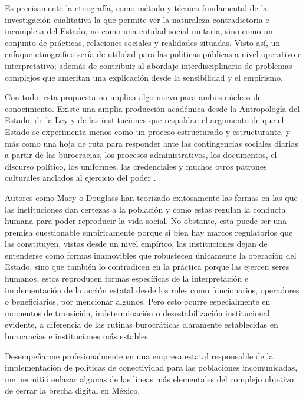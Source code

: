 \documentclass[
  spanish,
  11pt,
  a4paper,
]{scrbook}
\begin{document}
Es precisamente la etnografía, como método y técnica fundamental de la
investigación cualitativa la que permite ver la naturaleza
contradictoria e incompleta del Estado, no como una entidad social
unitaria, sino como un conjunto de prácticas, relaciones sociales y
realidades situadas. Visto así, un enfoque etnográfico sería de utilidad
para las políticas públicas a nivel operativo e interpretativo; además
de contribuir al abordaje interdisciplinario de problemas complejos que
ameritan una explicación desde la sensibilidad y el empirismo.

Con todo, esta propuesta no implica algo nuevo para ambos núcleos de
conocimiento. Existe una amplia producción académica desde la
Antropología del Estado, de la Ley y de las instituciones que respaldan
el argumento de que el Estado se experimenta menos como un proceso
estructurado y estructurante, y más como una hoja de ruta para responder
ante las contingencias sociales diarias a partir de las burocracias, los
procesos administrativos, los documentos, el discurso político, los
uniformes, las credenciales y muchos otros patrones culturales anclados
al ejercicio del poder
\autocite{Lipsky2010,Gupta2012,Weber1978,Das2004}.

Autores como Mary \textcite{Douglas1986} o Douglass \textcite{North1995}
han teorizado exitosamente las formas en las que las instituciones dan
certezas a la población y como estas regulan la conducta humana para
poder reproducir la vida social. No obstante, esta puede ser una premisa
cuestionable empíricamente porque si bien hay marcos regulatorios que
las constituyen, vistas desde un nivel empírico, las instituciones dejan
de entenderse como formas inamovibles que robustecen únicamente la
operación del Estado, sino que también lo contradicen en la práctica
porque las ejercen seres humanos, estos reproducen formas específicas de
la interpretación e implementación de la acción estatal desde los roles
como funcionarios, operadores o beneficiarios, por mencionar algunos.
Pero esto ocurre especialmente en momentos de transición,
indeterminación o desestabilización institucional evidente, a diferencia
de las rutinas burocráticas claramente establecidas en burocracias e
instituciones más estables \autocite{Graeber2018}.

Desempeñarme profesionalmente en una empresa estatal responsable de la
implementación de políticas de conectividad para las poblaciones
incomunicadas, me permitió enlazar algunas de las líneas más elementales
del complejo objetivo de cerrar la brecha digital en México.
\end{document}
